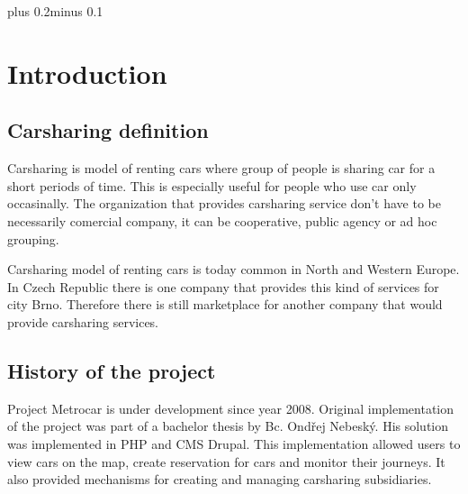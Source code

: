 \documentclass[11pt,twoside,a4paper]{book}
\begin{document}

\listoftables



\mainbodystarts
\normalfont
{}\baselineskip plus 0.2\baselineskip minus 0.1\baselineskip



% 
% 

\chapter{Introduction} 
\section{Carsharing definition} Carsharing is model of
renting cars where group of people is sharing car  for a short periods of
time. This is especially  useful for people who use car only occasinally. The
organization that provides carsharing service don't have to be necessarily
comercial company, it can be cooperative, public agency or ad hoc grouping\cite{wiki:carsharing}. 

Carsharing model of renting cars is today common in North and Western Europe. In Czech Republic 
there is one company that provides this kind of services for city Brno\cite{brno}. Therefore there is still marketplace 
for another company that would provide carsharing services. 
\section{History of the project}
Project Metrocar is under development since year 2008. Original implementation of the project was part 
of a bachelor thesis by Bc. Ondřej Nebeský. His solution was implemented in PHP and CMS Drupal. This implementation 
allowed users to view cars on the map, create reservation for cars and monitor their journeys. It also provided mechanisms 
for creating and managing carsharing subsidiaries\cite{Nebes09}. 
\end{document}
